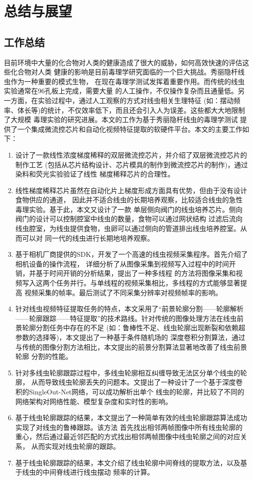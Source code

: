 \chapter{总结与展望}
\section{工作总结}
	目前环境中大量的化合物对人类的健康造成了很大的威胁，如何高效快速的评估这些化合物对人类
	健康的影响是目前毒理学研究面临的一个巨大挑战。秀丽隐杆线虫作为一种重要的模式生物，
	在现在毒理学测试发挥着重要作用。而传统的线虫实验通常在96孔板上完成，需要大量
	的人工操作，不仅操作复杂而且通量低。另一方面，在实验过程中，通过人工观察的方式对线虫相关生理特征
	(如：摆动频率、体长等)的统计，不仅效率低下，而且还会引入人为误差。这些都大大地限制了大规模
	毒理实验的研究进展。本文的工作为基于秀丽隐杆线虫的毒理学测试
	提供了一个集成微流控芯片和自动化视频特征提取的软硬件平台。本文的主要工作如下：
	\begin{enumerate}[label={(\arabic*)},font={\color{black!50!black}\bfseries}]
	\item 设计了一款线性浓度梯度稀释的双层微流控芯片，并介绍了双层微流控芯片的制作工艺
	(包括从芯片结构设计、芯片模具的制作到微流控芯片的制作)，通过染料和荧光实验验证了线性
	梯度稀释芯片的合理性。
	\item 线性梯度稀释芯片虽然在自动化片上梯度形成方面具有优势，但由于没有设计食物供应的通道，
	因此并不适合线虫的长期培养观察，比较适合线虫的急性毒理实验。基于此，本文又设计了一款
	单层侧向阀门的线虫培养芯片。侧向阀门的设计可以控制腔室中线虫的数量，食物可以通过网状结构
	过滤后流向线虫腔室，为线虫提供食物，虫卵可以通过侧向的管道排出线虫培养腔室。从而可以对
	同一代的线虫进行长期地培养观察。
	\item 基于相机厂商提供的SDK，开发了一个高速的线虫视频采集程序。首先介绍了相机设备的操作流程，
	详细分析了从图像采集到视频写入过程中的时间开销，并基于时间开销的分析结果，提出了一种多线程
	的方法将图像采集和视频写入这两个任务并行。与单线程的视频采集相比，多线程的方式能够显著提高
	视频采集的帧率。最后测试了不同采集分辨率对视频帧率的影响。
	\item 针对线虫视频特征提取任务的特点，本文采用了“前景轮廓分割——轮廓解析
——轮廓跟踪——特征提取”的技术路线。针对传统的图像处理方法在线虫前景轮廓分割任务中存在的不足
(如：鲁棒性不足、线虫轮廓出现断裂和依赖超参数的选择等)，本文提出了一种基于条件随机场的
深度卷积分割算法，通过与传统的图像分割方法相比，本文提出的前景分割算法显著地改善了线虫前景轮廓
分割的性能。
	\item 针对多线虫轮廓跟踪过程中，多线虫轮廓相互纠缠导致无法区分单个线虫的轮廓，
	从而导致线虫轮廓丢失的问题本。文提出了一种设计了一个基于深度卷积的SingleOut-Net网络，可以成功解析出单个
	线虫的轮廓，并比较了不同的网络架构对网络性能、模型复杂度和实时性的影响。
	\item 基于线虫轮廓跟踪的结果，本文提出了一种简单有效的线虫轮廓跟踪算法成功实现了对线虫的鲁棒跟踪。该方法
	首先找出相邻两帧图像中所有线虫轮廓的重心，然后通过最近邻匹配的方式找出相邻两帧图像中线虫轮廓之间的对应关系，
	从而实现对线虫轮廓的跟踪。
	\item 基于线虫轮廓跟踪的结果，本文介绍了线虫轮廓中间脊线的提取方法，以及基于线虫的中间脊线进行线虫摆动
	频率的计算。
	\end{enumerate}
	

